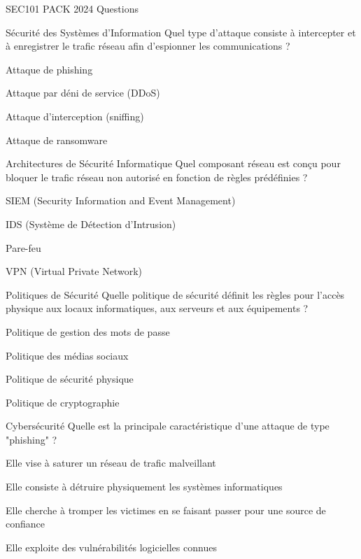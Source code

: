\documentclass[12pt]{article}
\begin{document}
\begin{quiz}{SEC101 PACK 2024 Questions}
  \begin{multi}[points=1]{Sécurité des Systèmes d'Information}
    Quel type d'attaque consiste à intercepter et à enregistrer le trafic réseau afin d'espionner les communications ?
    \item Attaque de phishing
    \item Attaque par déni de service (DDoS)
    \item* Attaque d'interception (sniffing)
    \item Attaque de ransomware
  \end{multi}

  \begin{multi}[points=1]{Architectures de Sécurité Informatique}
    Quel composant réseau est conçu pour bloquer le trafic réseau non autorisé en fonction de règles prédéfinies ?
    \item SIEM (Security Information and Event Management)
    \item IDS (Système de Détection d'Intrusion)
    \item* Pare-feu
    \item VPN (Virtual Private Network)
  \end{multi}

  \begin{multi}[points=1]{Politiques de Sécurité}
    Quelle politique de sécurité définit les règles pour l'accès physique aux locaux informatiques, aux serveurs et aux équipements ?
    \item Politique de gestion des mots de passe
    \item Politique des médias sociaux
    \item* Politique de sécurité physique
    \item Politique de cryptographie
  \end{multi}

  \begin{multi}[points=1]{Cybersécurité}
    Quelle est la principale caractéristique d'une attaque de type "phishing" ?
    \item Elle vise à saturer un réseau de trafic malveillant
    \item Elle consiste à détruire physiquement les systèmes informatiques
    \item* Elle cherche à tromper les victimes en se faisant passer pour une source de confiance
    \item Elle exploite des vulnérabilités logicielles connues
  \end{multi}


\end{quiz}
\end{document}
